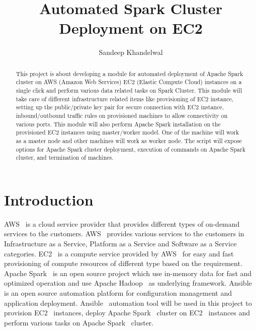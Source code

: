 
\title{Automated Spark Cluster Deployment on EC2}


\author{Sandeep Khandelwal}


\renewcommand{\shortauthors}{Sandeep}


\begin{abstract}

This project is about developing a module for automated deployment of
Apache Spark cluster on AWS (Amazon Web Services) EC2 (Elastic Compute
Cloud) instances on a single click and perform various data related
tasks on Spark Cluster. This module will take care of different
infrastructure related items like provisioning of EC2 instance,
setting up the public/private key pair for secure connection with EC2
instance, inbound/outbound traffic rules on provisioned machines to
allow connectivity on various ports. This module will also perform
Apache Spark installation on the provisioned EC2 instances using
master/worker model. One of the machine will work as a master node and
other machines will work as worker node. The script will expose
options for Apache Spark cluster deployment, execution of commands on
Apache Spark cluster, and termination of machines.

\end{abstract}



\maketitle

\section{Introduction}

AWS~\cite{hid-sp18-511-www-aws} is a cloud service provider that
provides different types of on-demand services to the
customers. AWS~\cite{hid-sp18-511-www-aws} provides various services
to the customers in Infrastructure as a Service, Platform as a Service
and Software as a Service categories. EC2~\cite{hid-sp18-511-www-ec2}
is a compute service provided by AWS~\cite{hid-sp18-511-www-aws} for
easy and fast provisioning of compute resources of different type
based on the requirement. Apache Spark~\cite{hid-sp18-511-www-spark}
is an open source project which use in-memory data for fast and
optimized operation and use Apache
Hadoop~\cite{hid-sp18-511-www-hadoop} as underlying
framework. Ansible~\cite{hid-sp18-511-www-ansible} is an open source
automation platform for configuration management and application
deployment. Ansible~\cite{hid-sp18-511-www-ansible} automation tool
will be used in this project to provision
EC2~\cite{hid-sp18-511-www-ec2} instances, deploy Apache
Spark~\cite{hid-sp18-511-www-spark} cluster on
EC2~\cite{hid-sp18-511-www-ec2} instances and perform various tasks on
Apache Spark~\cite{hid-sp18-511-www-spark} cluster.

